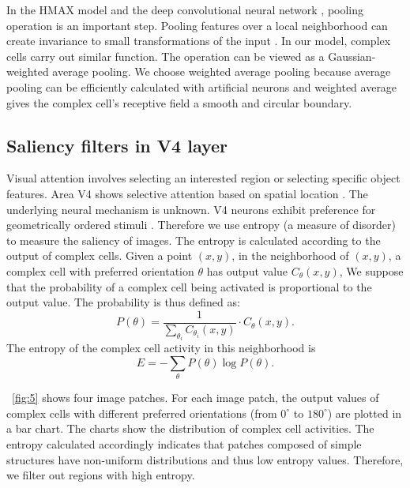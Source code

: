 \documentclass[9pt,twocolumn]{article}
\begin{document}
In the HMAX model \cite{riesenhuber1999} and the deep convolutional neural network \cite{krizhevsky2012}, pooling operation is an important step.
Pooling features over a local neighborhood can create invariance to small transformations of the input \cite{boureau2010}.
In our model, complex cells carry out similar function.
The operation can be viewed as a Gaussian-weighted average pooling.
We choose weighted average pooling because average pooling can be efficiently calculated with artificial neurons
and weighted average gives the complex cell's receptive field a smooth and circular boundary.  

\subsection{Saliency filters in V4 layer}

Visual attention involves selecting an interested region or selecting specific object features.
Area V4 shows selective attention based on spatial location \cite{desimone1995}.
The underlying neural mechanism is unknown.
V4 neurons exhibit preference for geometrically ordered stimuli \cite{sasaki2005}.
Therefore we use entropy (a measure of disorder) to measure the saliency of images.
The entropy is calculated according to the output of complex cells.
Given a point $(x,y)$, in the neighborhood of $(x,y)$,
a complex cell with preferred orientation $\theta$ has output value $C_{\theta}(x,y)$,
We suppose that the probability of a complex cell being activated is proportional to the output value.
The probability is thus defined as:
\begin{equation}
P(\theta)=\frac{1}{\sum_{\theta_i} C_{\theta_i}(x,y)}\cdot C_{\theta}(x,y).
\end{equation}
The entropy of the complex cell activity in this neighborhood is 
\begin{equation}
E=-\sum_{\theta} P(\theta) \log P(\theta).
\end{equation}

\figurename~\ref{fig:5} shows four image patches.
For each image patch, the output values of complex cells with different preferred orientations (from $0^\circ$ to $180^\circ$) are plotted in a bar chart.
The charts show the distribution of complex cell activities.
The entropy calculated accordingly indicates that patches composed of simple structures have non-uniform distributions and thus low entropy values.
Therefore, we filter out regions with high entropy.
\end{document}
